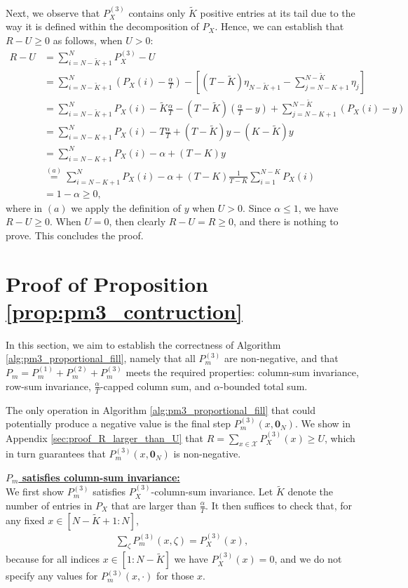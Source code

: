 \documentclass[11pt,letterpaper]{article}
\newcommand{\cX}{\mathcal{X}}
\begin{document}
Next, we observe that $P_X^{(3)}$ contains only $\tilde{K}$ positive entries at its tail due to the way it is defined within the decomposition of $P_X$. Hence, we can establish that $R - U \geq 0$ as follows, when $U>0$:
\begin{align*}
    R-U & = \sum_{i=N-\tilde{K}+1}^{N} P_X^{(3)} - U \\
    & = \sum_{i=N-\tilde{K}+1}^{N} \left( P_X(i) - \frac{\alpha}{T}\right) - \left[  (T-\tilde{K})\eta_{N-\tilde{K}+1} - \sum_{j = N-K+1}^{N-\tilde{K}} \eta_j \right]  \\
    &=\sum_{i=N-\tilde{K}+1}^{N} P_X(i) - \tilde{K}\frac{\alpha}{T} - (T-\tilde{K})(\frac{\alpha}{T}-y) + \sum_{j = N-K+1}^{N-\tilde{K}}\left( P_{X}(i)-y\right)   \\
    & = \sum_{i=N-K+1}^{N} P_X(i) - T \frac{\alpha}{T}+(T-\tilde{K})y-(K-\tilde{K})y\\
    & = \sum_{i=N-K+1}^{N} P_X(i) - \alpha + (T-K)y \\
    &\stackrel{(a)}{=} \sum_{i=N-K+1}^{N} P_X(i) - \alpha + (T-K)\frac{1}{T-K}\sum_{i=1}^{N-K}P_X(i) \\
    & = 1 - \alpha \geq 0 \label{eq:U_smaller_than_sum_r},
\end{align*}
where in $(a)$ we apply the definition of $y$ when $U>0$. Since $\alpha\leq 1$, we have $R-U\geq 0$. When $U=0$, then clearly $R-U=R\geq 0$, and there is nothing to prove. This concludes the proof. 

\section{Proof of Proposition \ref{prop:pm3_contruction}} \label{sec:proof_pm3_prop}

In this section, we aim to establish the correctness of Algorithm \ref{alg:pm3_proportional_fill}, namely that all $P_m^{(3)}$ are non-negative, and that $P_m = P_m^{(1)} + P_m^{(2)} + P_m^{(3)}$ meets the required properties:  column-sum invariance, row-sum invariance, $\tfrac{\alpha}{T}$-capped column sum, and $\alpha$-bounded total sum. 

The only operation in Algorithm \ref{alg:pm3_proportional_fill} that could potentially produce a negative value is the final step $P_m^{(3)}(x,\mathbf{0}_N)$. We show in Appendix  \ref{sec:proof_R_larger_than_U} that $R = \sum_{x \in \cX}P_X^{(3)}(x) \geq U$, which in turn guarantees that $P_m^{(3)}(x,\mathbf{0}_N)$ is non-negative.

\underline{\textbf{$P_m$ satisfies column-sum invariance:}} \\
We first show $P_m^{(3)}$ satisfies $P_X^{(3)}$-column-sum invariance. Let $\tilde{K}$ denote the number of entries in $P_X$ that are larger than $\tfrac{\alpha}{T}$. It then suffices to check that, for any fixed $x \in [N-\tilde{K}+1 : N]$,
\begin{align}
    \sum_\zeta P_m^{(3)}(x,\zeta) = P_X^{(3)}(x),
\end{align}
because for all indices $x \in [1 : N-\tilde{K}]$ we have $P_X^{(3)}(x) = 0$, and we do not specify any values for $P_m^{(3)}(x,\cdot)$ for those $x$.
\end{document}
